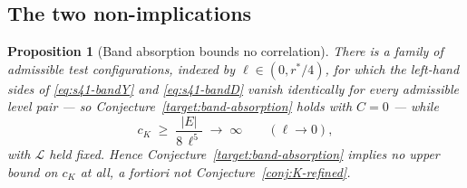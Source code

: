 \documentclass[11pt]{article}
\newtheorem{proposition}[theorem]{Proposition}
\theoremstyle{definition}
\theoremstyle{remark}
\begin{document}
\subsection{The two non-implications}
\label{subsec:s44-nonimplications}

\begin{proposition}[Band absorption bounds no correlation]
  \label{prop:s44-b-fails}
  There is a family of admissible test configurations, indexed by
  $\ell\in(0,r^*/4)$, for which the left-hand sides of
  \eqref{eq:s41-bandY} and \eqref{eq:s41-bandD} \emph{vanish identically} for
  every admissible level pair --- so
  Conjecture~\ref{target:band-absorption} holds with $C=0$ --- while
  \[
    c_K \;\geq\;\frac{|E|}{8\,\ell^{5}}\;\longrightarrow\;\infty
    \qquad(\ell\to0),
  \]
  with $\mathcal{L}$ held fixed. Hence
  Conjecture~\ref{target:band-absorption} implies no upper bound on $c_K$ at
  all, a fortiori not Conjecture~\ref{conj:K-refined}.
\end{proposition}
\end{document}
